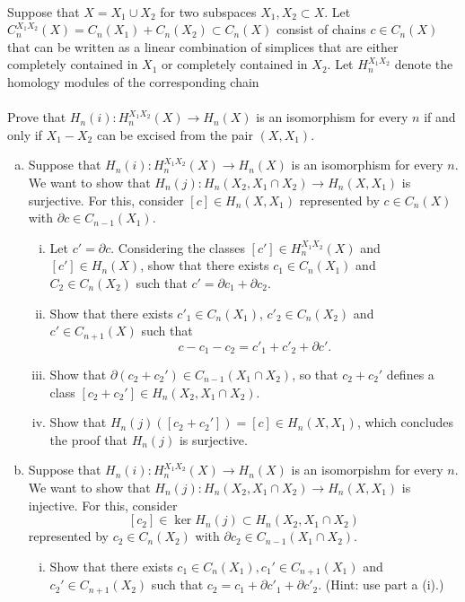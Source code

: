 \documentclass{article}
\newenvironment{problem}[2][Problem]{\begin{trivlist}
\item[\hskip \labelsep {\bfseries #1}\hskip \labelsep {\bfseries #2.}]}{\end{trivlist}}
\newcommand{\fn}[3]{#1 \colon #2 \rightarrow #3}
\begin{document}
\begin{problem}{4} \text{} \\
  Suppose that $X = X_1 \cup X_2$ for two subspaces $X_1, X_2 \subset X$. Let
  $C_n^{X_1X_2}(X) = C_n(X_1) + C_n(X_2) \subset C_n(X)$ consist of chains
  $c \in C_n(X)$ that can be written as a linear combination of simplices that
  are either completely contained in $X_1$ or completely contained in $X_2$.
  Let $H_n^{X_1X_2}$ denote the homology modules of the corresponding chain
  \\~\\
  Prove that $\fn{H_n(i)}{H_n^{X_1X_2}(X)}{H_n(X)}$ is an isomorphism for every $n$
  if and only if $X_1 - X_2$ can be excised from the pair $(X, X_1)$.
  \begin{enumerate}[a.]
    \item Suppose that $\fn{H_n(i)}{H_n^{X_1X_2}(X)}{H_n(X)}$ is an isomorphism
    for every $n$. We want to show that
    $\fn{H_n(j)}{H_n(X_2,X_1 \cap X_2)}{H_n(X, X_1)}$ is surjective.
    For this, consider $[c] \in H_n(X,X_1)$ represented by $c \in C_n(X)$ with
    $\partial c \in C_{n-1}(X_1)$.
    \begin{enumerate}[(i)]
      \item Let $c' = \partial c$. Considering the classes $[c'] \in H_n^{X_1X_2}(X)$ and
      $[c'] \in H_n(X)$, show that there exists $c_1 \in C_n(X_1)$ and
      $C_2 \in C_n(X_2)$ such that $c' = \partial c_1 + \partial c_2$.
      \item Show that there exists $c'_1  \in C_n(X_1)$, $c'_2 \in C_n(X_2)$ and
      $c' \in C_{n+1}(X)$ such that \[
        c-c_1-c_2 = c'_1 + c'_2 + \partial c'.
      \]
      \item Show that $\partial(c_2 + c_2') \in C_{n-1}(X_1 \cap X_2)$, so that
      $c_2 + c_2'$ defines a class $[c_2 + c_2'] \in H_n(X_2, X_1 \cap X_2)$.
      \item Show that $H_n(j)([c_2 + c_2']) = [c] \in H_n(X, X_1)$, which
      concludes the proof that $H_n(j)$ is surjective.
    \end{enumerate}
    \item Suppose that $\fn{H_n(i)}{H_n^{X_1X_2}(X)}{H_n(X)}$ is an isomorpishm
    for every $n$. We want to show that
    $\fn{H_n(j)}{H_n(X_2,X_1 \cap X_2)}{H_n(X, X_1)}$ is injective. For this,
    consider \[
      [c_2] \in \ker H_n(j) \subset H_n(X_2, X_1 \cap X_2)
    \] represented
    by $c_2 \in C_n(X_2)$ with $\partial c_2 \in C_{n-1}(X_1 \cap X_2)$.
    \begin{enumerate}[(i)]
      \item Show that there exists $c_1 \in C_n(X_1), c_1' \in C_{n+1}(X_1)$ and
      $c_2' \in C_{n+1}(X_2)$ such that $c_2 = c_1 + \partial c'_1 + \partial c'_2$. (Hint: use part a (i).)
    \end{enumerate}
  \end{enumerate}
\end{problem}
\end{document}
